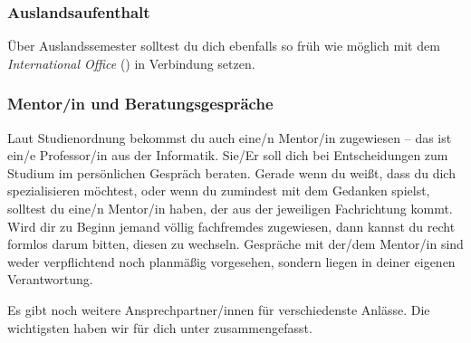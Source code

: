 \subsubsection{Auslandsaufenthalt}
	Über Auslandssemester solltest du dich ebenfalls so früh wie möglich mit dem \emph{International Office} () in Verbindung setzen.

\subsubsection{Mentor/in und Beratungsgespräche}
	Laut Studienordnung bekommst du auch eine/n Mentor/in zugewiesen -- das ist ein/e Professor/in aus der Informatik. Sie/Er soll dich bei Entscheidungen zum Studium im persönlichen Gespräch beraten. Gerade wenn du weißt, dass du dich spezialisieren möchtest, oder wenn du zumindest mit dem Gedanken spielst, solltest du eine/n Mentor/in haben, der aus der jeweiligen Fachrichtung kommt. Wird dir zu Beginn jemand völlig fachfremdes zugewiesen, dann kannst du recht formlos darum bitten, diesen zu wechseln. Gespräche mit der/dem Mentor/in sind weder verpflichtend noch planmäßig vorgesehen, sondern liegen in deiner eigenen Verantwortung.

Es gibt  noch weitere Ansprechpartner/innen für verschiedenste Anlässe. Die wichtigsten haben wir für dich unter  zusammengefasst.
